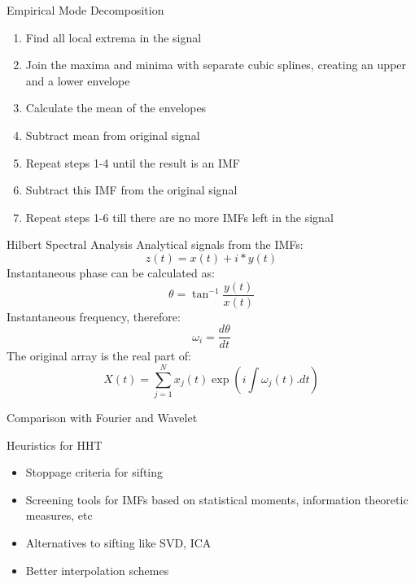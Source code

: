\documentclass[xcolor=dvipsnames]{beamer}
\begin{document}
\begin{frame}{Empirical Mode Decomposition}
\begin{enumerate}
\item Find all local extrema in the signal
\item Join the maxima and minima with separate cubic splines, creating an upper and a lower envelope
\item Calculate the mean of the envelopes
\item Subtract mean from original signal
\item Repeat steps 1-4 until the result is an IMF
\item Subtract this IMF from the original signal
\item Repeat steps 1-6 till there are no more IMFs left in the signal
\end{enumerate}
\end{frame}
%
\begin{frame}{Hilbert Spectral Analysis}
Analytical signals from the IMFs:
\begin{equation}
z(t)=x(t)+i*y(t)
\end{equation}
Instantaneous phase can be calculated as:
\begin{equation}
\theta =  \tan ^{-1}  {\frac{y(t)}{x(t)}} 
\end{equation}
Instantaneous frequency, therefore:
\begin{equation}
\omega _{i}=\frac{d \theta}{dt}
\end{equation}
The original array is the real part of:
\begin{equation}
X(t)=\sum _{j=1} ^{N} x_{j}(t) \exp   (i\int \omega_{j} (t).dt)
\end{equation}
\end{frame}
%
\begin{frame}{Comparison with Fourier and Wavelet}
\end{frame}
%
\begin{frame}{Heuristics for HHT}
\begin{itemize}
\item Stoppage criteria for sifting
\item Screening tools for IMFs based on statistical moments, information theoretic measures, etc
\item Alternatives to sifting like SVD, ICA
\item Better interpolation schemes
\end{itemize}
\end{frame}
\end{document}
